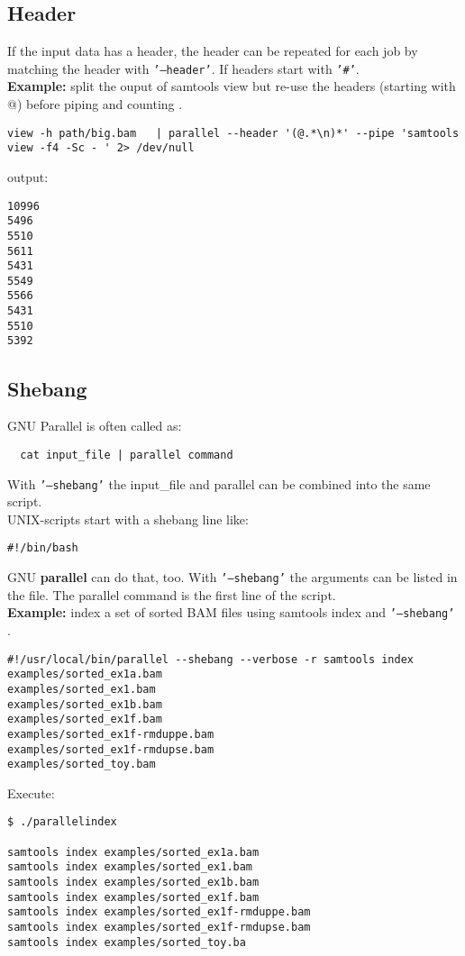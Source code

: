 \documentclass{article}
\newcommand{\example}[1]{
\textbf{Example: } {\color[rgb]{0,0,1} #1 } .
}
\newcommand{\cmdoption}[1]{\texttt{'#1'}}
\def\prl{\textbf{parallel}}
\begin{document}
\subsection{Header}
If the input data has a header, the header can be repeated for each job by matching the header with \cmdoption{--header}. If headers start with \cmdoption{\#}.\\
\example{split the ouput of samtools view but re-use the headers (starting with @) before piping and counting}
\begin{lstlisting}
view -h path/big.bam   | parallel --header '(@.*\n)*' --pipe 'samtools view -f4 -Sc - ' 2> /dev/null 
\end{lstlisting}
output:
\begin{lstlisting}
10996
5496
5510
5611
5431
5549
5566
5431
5510
5392
\end{lstlisting}

\subsection{Shebang}
GNU Parallel is often called as:
\begin{lstlisting}
  cat input_file | parallel command
\end{lstlisting}
With \cmdoption{--shebang} the input\_file and parallel can be combined into the same script.\\
UNIX-scripts start with a shebang line like:
\begin{lstlisting}
#!/bin/bash
\end{lstlisting}

GNU \prl{} can do that, too. With \cmdoption{--shebang} the arguments can be listed in the file. The parallel command is the first line of the script.\\
\example{index a set of sorted BAM files using samtools index and  \cmdoption{--shebang}}
\begin{lstlisting}
#!/usr/local/bin/parallel --shebang --verbose -r samtools index
examples/sorted_ex1a.bam
examples/sorted_ex1.bam
examples/sorted_ex1b.bam
examples/sorted_ex1f.bam
examples/sorted_ex1f-rmduppe.bam
examples/sorted_ex1f-rmdupse.bam
examples/sorted_toy.bam
\end{lstlisting}

Execute:
\begin{lstlisting}
$ ./parallelindex

samtools index examples/sorted_ex1a.bam
samtools index examples/sorted_ex1.bam
samtools index examples/sorted_ex1b.bam
samtools index examples/sorted_ex1f.bam
samtools index examples/sorted_ex1f-rmduppe.bam
samtools index examples/sorted_ex1f-rmdupse.bam
samtools index examples/sorted_toy.ba
\end{lstlisting}
\end{document}

